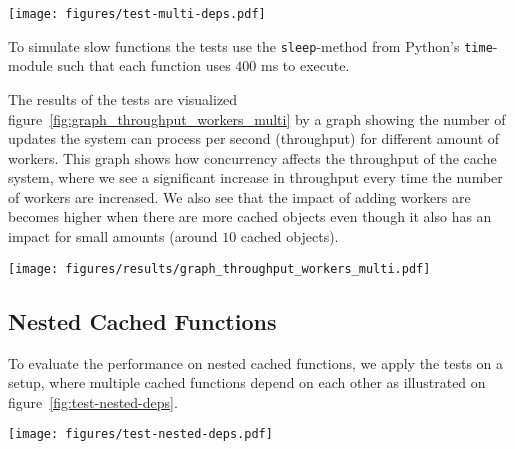 \begin{figure*}[ht!]
  \centering
  \texttt{[image: figures/test-multi-deps.pdf]}
  \caption{Illustration of the dependencies of the cached function for the "Many Cached Functions" test case}
  \label{fig:test-multi-deps}
\end{figure*}

To simulate slow functions the tests use the \verb$sleep$-method from Python's \verb$time$-module such that each function uses $400$ ms to execute.

The results of the tests are visualized figure~\ref{fig:graph_throughput_workers_multi} by a graph showing the number of updates the system can process per second (throughput) for different amount of workers. This graph shows how concurrency affects the throughput of the cache system, where we see a significant increase in throughput every time the number of workers are increased. We also see that the impact of adding workers are becomes higher when there are more cached objects even though it also has an impact for small amounts (around $10$ cached objects).

\begin{figure*}[ht!]
  \centering
  \texttt{[image: figures/results/graph\_throughput\_workers\_multi.pdf]}
  \caption{How the system scales with many cached functions depending on the same underlying data while the number of workers is increased}
  \label{fig:graph_throughput_workers_multi}
\end{figure*}


\subsection{Nested Cached Functions}
\label{subsec:nested-cached-functions}

To evaluate the performance on nested cached functions, we apply the tests on a setup, where multiple cached functions depend on each other as illustrated on figure~\ref{fig:test-nested-deps}.

\begin{figure*}[ht!]
  \centering
  \texttt{[image: figures/test-nested-deps.pdf]}
  \caption{Illustration of the dependencies of the cached function for the "Nested Cached Functions" test case}
  \label{fig:test-nested-deps}
\end{figure*}

